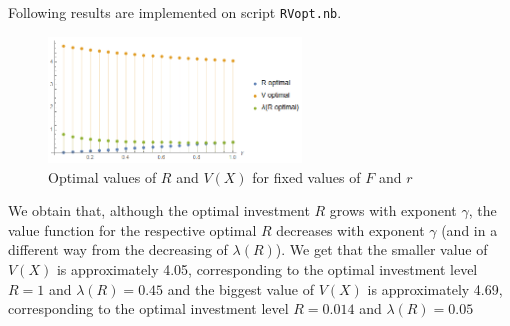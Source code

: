 Following results are implemented on script \texttt{RVopt.nb}.


\begin{figure}[!htb]
	\centering
	\includegraphics[width=0.6\textwidth]{Prob1_MaxProb/RVlambda_opt05.PNG}
	\caption{Optimal values of $R$ and $V(X)$ for fixed values of $F$ and $r$}
\end{figure}

We obtain that, although the optimal investment $R$ grows with exponent $\gamma$, the value function for the respective optimal $R$ decreases with exponent $\gamma$ (and in a different way from the decreasing of $\lambda(R)$). We get that the smaller value of $V(X)$ is approximately 4.05, corresponding to the optimal investment level $R=1$ and $\lambda(R)=0.45$ and the biggest value of $V(X)$ is approximately 4.69, corresponding to the optimal investment level $R=0.014$ and $\lambda(R)=0.05$
